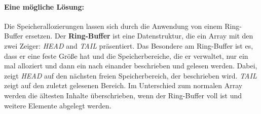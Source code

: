 \paragraph*{Eine mögliche Lösung:}
Die Speicherallozierungen lassen sich durch die Anwendung von einem Ring-Buffer
ersetzen. Der \textbf{Ring-Buffer} ist eine Datenstruktur, die ein Array mit den zwei
Zeiger: \emph{HEAD} and \emph{TAIL} präsentiert. Das Besondere am Ring-Buffer
ist es, dass er eine feste Größe hat und die Speicherbereiche, die er verwaltet,
nur ein mal alloziert und dann ein nach einander beschrieben und gelesen
werden. Dabei, zeigt \emph{HEAD} auf den nächsten freien Speicherbereich, der
beschrieben wird. \emph{TAIL} zeigt auf den zuletzt gelesenen Bereich. Im
Unterschied zum normalen Array werden die ältesten Inhalte überschrieben, wenn
der Ring-Buffer voll ist und weitere Elemente abgelegt werden.
%
